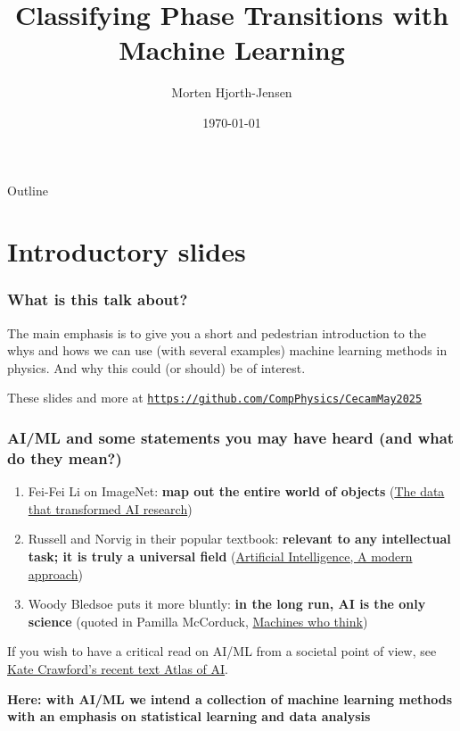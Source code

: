 \documentclass{beamer}
\title{Classifying Phase Transitions with Machine Learning}
\author{Morten Hjorth-Jensen}
\date{\today}
\begin{document}
\begin{frame}
 \titlepage
\end{frame}

\begin{frame}{Outline}
 \tableofcontents
\end{frame}


\section{Introductory slides}

\begin{frame}
\frametitle{What is this talk about?}

\begin{block}{}
The main emphasis is to give you a short and pedestrian introduction to the whys and hows we can use (with several examples) machine learning methods
in physics. And why this could (or should) be of interest. 
\end{block}

\begin{block}{}
These slides and more at \href{{http://mhjensenseminars.github.io/MachineLearningTalk/doc/pub/Geiloschool/}}{\nolinkurl{https://github.com/CompPhysics/CecamMay2025}}
\end{block}
\end{frame}


\begin{frame}
\frametitle{AI/ML and some statements you may have heard (and what do they mean?)}

\begin{enumerate}
\item Fei-Fei Li on ImageNet: \textbf{map out the entire world of objects} (\href{{https://cacm.acm.org/news/219702-the-data-that-transformed-ai-research-and-possibly-the-world/fulltext}}{The data that transformed AI research})

\item Russell and Norvig in their popular textbook: \textbf{relevant to any intellectual task; it is truly a universal field} (\href{{http://aima.cs.berkeley.edu/}}{Artificial Intelligence, A modern approach})

\item Woody Bledsoe puts it more bluntly: \textbf{in the long run, AI is the only science} (quoted in Pamilla McCorduck, \href{{https://www.pamelamccorduck.com/machines-who-think}}{Machines who think})
\end{enumerate}

\noindent
If you wish to have a critical read on AI/ML from a societal point of view, see \href{{https://www.katecrawford.net/}}{Kate Crawford's recent text Atlas of AI}. 

\textbf{Here: with AI/ML we intend a collection of machine learning methods with an emphasis on statistical learning and data analysis}
\end{frame}
\end{document}
